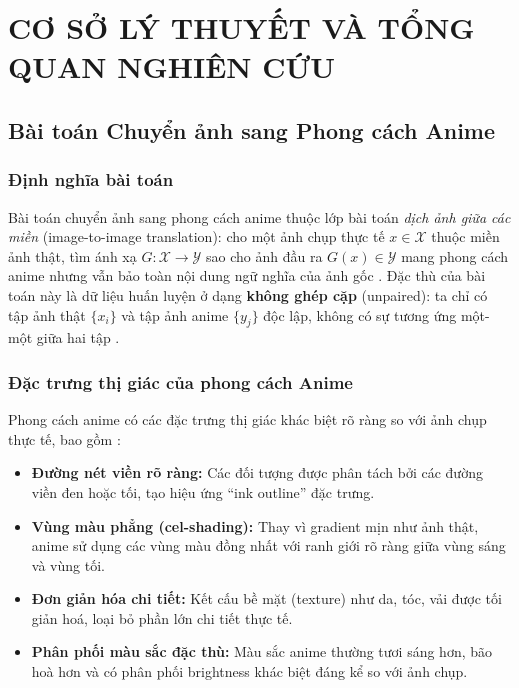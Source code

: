\clearpage


\setcounter{chapter}{0}
\chapter[{CƠ SỞ LÝ THUYẾT VÀ TỔNG QUAN NGHIÊN CỨU}]{CƠ SỞ LÝ THUYẾT VÀ TỔNG QUAN NGHIÊN CỨU}

\section{Bài toán Chuyển ảnh sang Phong cách Anime}
\label{sec:anime_problem}

\subsection{Định nghĩa bài toán}

Bài toán chuyển ảnh sang phong cách anime thuộc lớp bài toán \textit{dịch ảnh giữa các miền} (image-to-image translation): cho một ảnh chụp thực tế $x \in \mathcal{X}$ thuộc miền ảnh thật, tìm ánh xạ $G: \mathcal{X} \to \mathcal{Y}$ sao cho ảnh đầu ra $G(x) \in \mathcal{Y}$ mang phong cách anime nhưng vẫn bảo toàn nội dung ngữ nghĩa của ảnh gốc \cite{Isola2017, Zhu2017}. Đặc thù của bài toán này là dữ liệu huấn luyện ở dạng \textbf{không ghép cặp} (unpaired): ta chỉ có tập ảnh thật $\{x_i\}$ và tập ảnh anime $\{y_j\}$ độc lập, không có sự tương ứng một-một giữa hai tập \cite{Zhu2017}.

\subsection{Đặc trưng thị giác của phong cách Anime}

Phong cách anime có các đặc trưng thị giác khác biệt rõ ràng so với ảnh chụp thực tế, bao gồm \cite{Chen2020, Liu2024}:
\begin{itemize}
    \item \textbf{Đường nét viền rõ ràng:} Các đối tượng được phân tách bởi các đường viền đen hoặc tối, tạo hiệu ứng ``ink outline'' đặc trưng.
    \item \textbf{Vùng màu phẳng (cel-shading):} Thay vì gradient mịn như ảnh thật, anime sử dụng các vùng màu đồng nhất với ranh giới rõ ràng giữa vùng sáng và vùng tối.
    \item \textbf{Đơn giản hóa chi tiết:} Kết cấu bề mặt (texture) như da, tóc, vải được tối giản hoá, loại bỏ phần lớn chi tiết thực tế.
    \item \textbf{Phân phối màu sắc đặc thù:} Màu sắc anime thường tươi sáng hơn, bão hoà hơn và có phân phối brightness khác biệt đáng kể so với ảnh chụp.
\end{itemize}

